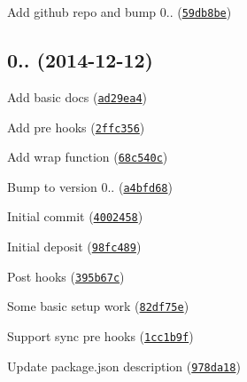 \begin{DoxyItemize}
\item Add github repo and bump 0.. (\href{https://github.com/vkarpov15/kareem/commit/59db8be}{\tt 59db8be})
\end{DoxyItemize}

\label{_0.0.1}%
 \subsection*{
\footnotesize 0.. (2014-\/12-\/12)
\normalsize }


\begin{DoxyItemize}
\item Add basic docs (\href{https://github.com/vkarpov15/kareem/commit/ad29ea4}{\tt ad29ea4})
\item Add pre hooks (\href{https://github.com/vkarpov15/kareem/commit/2ffc356}{\tt 2ffc356})
\item Add wrap function (\href{https://github.com/vkarpov15/kareem/commit/68c540c}{\tt 68c540c})
\item Bump to version 0.. (\href{https://github.com/vkarpov15/kareem/commit/a4bfd68}{\tt a4bfd68})
\item Initial commit (\href{https://github.com/vkarpov15/kareem/commit/4002458}{\tt 4002458})
\item Initial deposit (\href{https://github.com/vkarpov15/kareem/commit/98fc489}{\tt 98fc489})
\item Post hooks (\href{https://github.com/vkarpov15/kareem/commit/395b67c}{\tt 395b67c})
\item Some basic setup work (\href{https://github.com/vkarpov15/kareem/commit/82df75e}{\tt 82df75e})
\item Support sync pre hooks (\href{https://github.com/vkarpov15/kareem/commit/1cc1b9f}{\tt 1cc1b9f})
\item Update package.\+json description (\href{https://github.com/vkarpov15/kareem/commit/978da18}{\tt 978da18}) 
\end{DoxyItemize}
